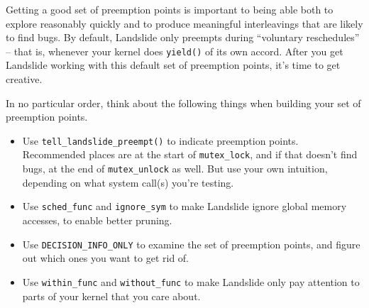 \documentclass{article}
\begin{document}
Getting a good set of preemption points is important to being able both to explore reasonably quickly and to produce meaningful interleavings that are likely to find bugs. By default, Landslide only preempts during ``voluntary reschedules'' -- that is, whenever your kernel does \texttt{yield()} of its own accord. After you get Landslide working with this default set of preemption points, it's time to get creative.

In no particular order, think about the following things when building your set of preemption points.

\begin{itemize}
	\item Use \texttt{tell\_landslide\_preempt()} to indicate preemption points. Recommended places are at the start of \texttt{mutex\_lock}, and if that doesn't find bugs, at the end of \texttt{mutex\_unlock} as well. But use your own intuition, depending on what system call(s) you're testing.
	\item Use \texttt{sched\_func} and \texttt{ignore\_sym} to make Landslide ignore global memory accesses, to enable better pruning.
	\item Use \texttt{DECISION\_INFO\_ONLY} to examine the set of preemption points, and figure out which ones you want to get rid of.
	\item Use \texttt{within\_func} and \texttt{without\_func} to make Landslide only pay attention to parts of your kernel that you care about.
\end{itemize}

\end{document}
